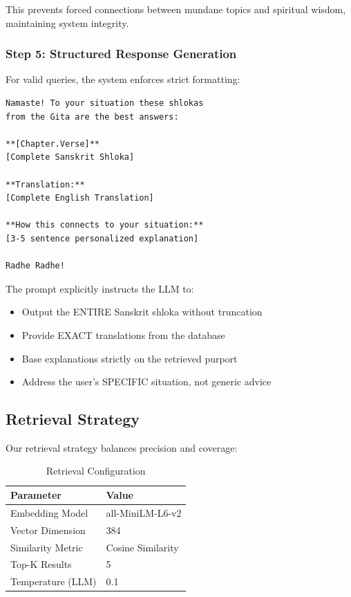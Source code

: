 \documentclass[conference]{IEEEtran}
\begin{document}
This prevents forced connections between mundane topics and spiritual wisdom, maintaining system integrity.

\subsubsection{Step 5: Structured Response Generation}
For valid queries, the system enforces strict formatting:

\begin{verbatim}
Namaste! To your situation these shlokas 
from the Gita are the best answers:

**[Chapter.Verse]**
[Complete Sanskrit Shloka]

**Translation:**
[Complete English Translation]

**How this connects to your situation:**
[3-5 sentence personalized explanation]

Radhe Radhe!
\end{verbatim}

The prompt explicitly instructs the LLM to:
\begin{itemize}
    \item Output the ENTIRE Sanskrit shloka without truncation
    \item Provide EXACT translations from the database
    \item Base explanations strictly on the retrieved purport
    \item Address the user's SPECIFIC situation, not generic advice
\end{itemize}

\subsection{Retrieval Strategy}

Our retrieval strategy balances precision and coverage:

\begin{table}[htbp]
\caption{Retrieval Configuration}
\centering
\begin{tabular}{|l|l|}
\hline
\textbf{Parameter} & \textbf{Value} \\
\hline
Embedding Model & all-MiniLM-L6-v2 \\
Vector Dimension & 384 \\
Similarity Metric & Cosine Similarity \\
Top-K Results & 5 \\
Temperature (LLM) & 0.1 \\
\hline
\end{tabular}
\label{tab:retrieval}
\end{table}
\end{document}
